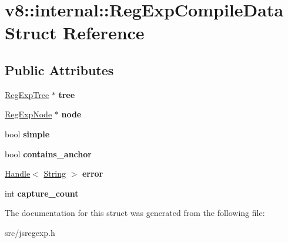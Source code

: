 \hypertarget{structv8_1_1internal_1_1_reg_exp_compile_data}{}\section{v8\+:\+:internal\+:\+:Reg\+Exp\+Compile\+Data Struct Reference}
\label{structv8_1_1internal_1_1_reg_exp_compile_data}
\subsection*{Public Attributes}
\begin{DoxyCompactItemize}
\item 
\hypertarget{structv8_1_1internal_1_1_reg_exp_compile_data_a3708590201a9779d3673351f2f00f5b5}{}\hyperlink{classv8_1_1internal_1_1_reg_exp_tree}{Reg\+Exp\+Tree} $\ast$ {\bfseries tree}\label{structv8_1_1internal_1_1_reg_exp_compile_data_a3708590201a9779d3673351f2f00f5b5}

\item 
\hypertarget{structv8_1_1internal_1_1_reg_exp_compile_data_a5c7d6ebed31abb05a2e5c36b9845401a}{}\hyperlink{classv8_1_1internal_1_1_reg_exp_node}{Reg\+Exp\+Node} $\ast$ {\bfseries node}\label{structv8_1_1internal_1_1_reg_exp_compile_data_a5c7d6ebed31abb05a2e5c36b9845401a}

\item 
\hypertarget{structv8_1_1internal_1_1_reg_exp_compile_data_a5aa50533560892ee932515808bd70093}{}bool {\bfseries simple}\label{structv8_1_1internal_1_1_reg_exp_compile_data_a5aa50533560892ee932515808bd70093}

\item 
\hypertarget{structv8_1_1internal_1_1_reg_exp_compile_data_a25f107ad7d0816bc0a970cae153d2bb6}{}bool {\bfseries contains\+\_\+anchor}\label{structv8_1_1internal_1_1_reg_exp_compile_data_a25f107ad7d0816bc0a970cae153d2bb6}

\item 
\hypertarget{structv8_1_1internal_1_1_reg_exp_compile_data_a8a47f8e4d306fce7d1b8596414248760}{}\hyperlink{classv8_1_1internal_1_1_handle}{Handle}$<$ \hyperlink{classv8_1_1internal_1_1_string}{String} $>$ {\bfseries error}\label{structv8_1_1internal_1_1_reg_exp_compile_data_a8a47f8e4d306fce7d1b8596414248760}

\item 
\hypertarget{structv8_1_1internal_1_1_reg_exp_compile_data_a1e24fe15bae48fc5fa0bd565dadca421}{}int {\bfseries capture\+\_\+count}\label{structv8_1_1internal_1_1_reg_exp_compile_data_a1e24fe15bae48fc5fa0bd565dadca421}

\end{DoxyCompactItemize}


The documentation for this struct was generated from the following file\+:\begin{DoxyCompactItemize}
\item 
src/jsregexp.\+h\end{DoxyCompactItemize}
